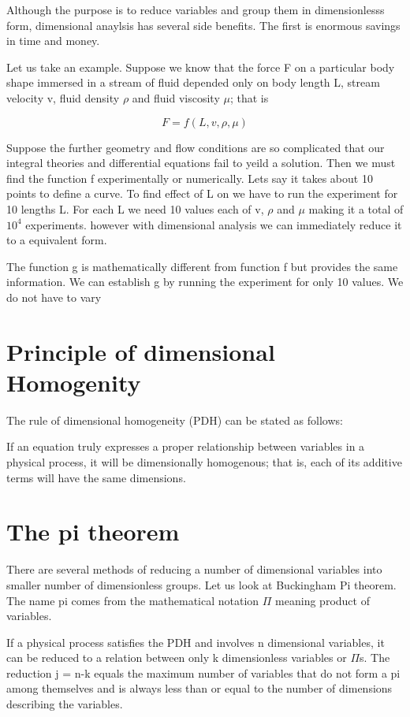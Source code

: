 \documentclass{report}
\begin{document}
Although the purpose is to reduce variables and group them in dimensionlesss form,
dimensional anaylsis has several side benefits. The first is enormous savings in time and money.

Let us take an example.
Suppose we know that the force F on a particular body shape immersed in a stream of fluid depended only on body length L, stream velocity v,
fluid density \(\rho\) and fluid viscosity \(\mu\); that is 

\[ F=f(L, v, \rho, \mu)\]

Suppose the further geometry and flow conditions are so complicated that our integral theories and differential equations
fail to yeild a solution. Then we must find the function f experimentally or numerically.
Lets say it takes about 10 points to define a curve. To find effect of L on we have to run the experiment for 10 lengths L.
For each L we need 10 values each of v, \(\rho\) and \(\mu\) making it a total of \(10^4\) experiments. however with dimensional analysis we can
immediately reduce it to a equivalent form.

The function g is mathematically different from function f but provides the same information. We can establish g by running
the experiment for only 10 values. We do not have to vary 


\section{Principle of dimensional Homogenity}
The rule of dimensional homogeneity (PDH) can be stated as follows:

If an equation truly expresses a proper relationship between variables in a physical process, it will be dimensionally homogenous; that is,
each of its additive terms will have the same dimensions.
\section{The pi theorem}

There are several methods of reducing a number of dimensional variables into smaller number of dimensionless groups. Let us look at Buckingham Pi theorem.
The name pi comes from the mathematical notation \(\Pi\) meaning product of variables. 

If a physical process satisfies the PDH and involves n dimensional variables, it can be reduced to a relation between only k dimensionless variables or \(\Pi\)s. The
reduction j = n-k equals the maximum number of variables that do not form a pi among themselves and is always less than or equal to the number of dimensions describing 
the variables.
\end{document}
